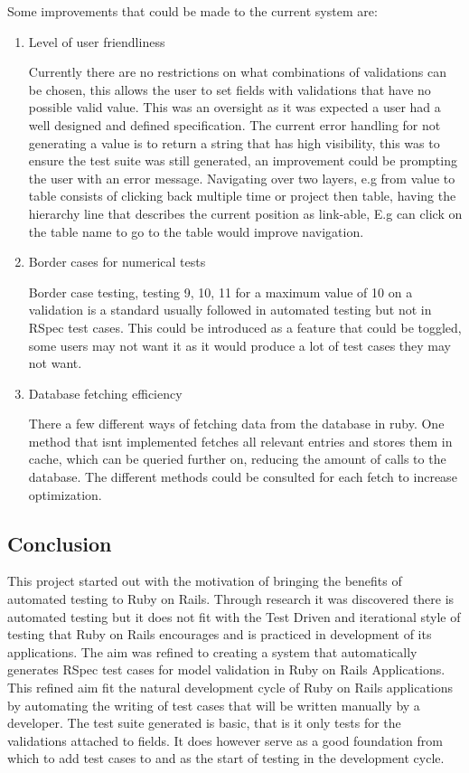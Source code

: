 \documentclass[a4paper,12pt]{article}
\begin{document}
\par Some improvements that could be made to the current system are:
\begin{enumerate}
\item Level of user friendliness
\par Currently there are no restrictions on what combinations of validations can be chosen, this allows the user to set fields with validations that have no possible valid value. This was an oversight as it was expected a user had a well designed and defined specification. The current error handling for not generating a value is to return a string that has high visibility, this was to ensure the test suite was still generated, an improvement could be prompting the user with an error message. Navigating over two layers, e.g from value to table consists of clicking back multiple time or project then table, having the hierarchy line that describes the current position as link-able, E.g can click on the table name to go to the table would improve navigation.
\item Border cases for numerical tests
\par Border case testing, testing 9, 10, 11 for a maximum value of 10 on a validation is a standard usually followed in automated testing but not in RSpec test cases. This could be introduced as a feature that could be toggled, some users may not want it as it would produce a lot of test cases they may not want.
\item Database fetching efficiency
\par There a few different ways of fetching data from the database in ruby. One method that isnt implemented fetches all relevant entries and stores them in cache, which can be queried further on, reducing the amount of calls to the database. The different methods could be consulted for each fetch to increase optimization.
\end{enumerate}


\subsection{Conclusion}

\par This project started out with the motivation of bringing the benefits of automated testing to Ruby on Rails. Through research it was discovered there is automated testing but it does not fit with the Test Driven  and iterational style of testing that Ruby on Rails encourages and is practiced in development of its applications. The aim was refined to creating a system that automatically generates RSpec test cases for model validation in Ruby on Rails Applications. This refined aim fit the natural development cycle of Ruby on Rails applications by automating the writing of test cases that will be written manually by a developer. The test suite generated is basic, that is it only tests for the validations attached to fields. It does however serve as a good foundation from which to add test cases to and as the start of testing in the development cycle.
\end{document}
